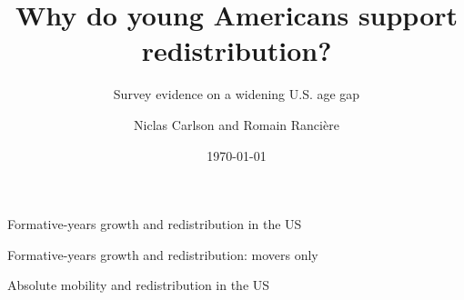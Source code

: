 \documentclass{beamer}
\title[Youth and redistribution]{Why do young Americans support redistribution?}
\subtitle{Survey evidence on a widening U.S. age gap}
\author[Carlson and Rancière]{Niclas Carlson and Romain Rancière}
\date{\today}
\begin{document}
\begin{frame}
\titlepage
\end{frame}



\begin{frame}{Formative-years growth and redistribution in the US}

\begin{table}
    \centering
    \caption{Prolific 2025: support for redistribution on home-state formative-years income growth}
    \vspace{-1.1em}
    {\tiny\setlength{\tabcolsep}{4pt}\renewcommand{\arraystretch}{0.82}
    }
\end{table}

\end{frame}



\begin{frame}{Formative-years growth and redistribution: movers only}

\begin{table}
    \centering
    \caption{Prolific 2025, movers only (home state $\neq$ current state): support for redistribution on home-state formative growth, with and without current-state FE}
    \vspace{-1.1em}
    {\tiny\setlength{\tabcolsep}{5pt}\renewcommand{\arraystretch}{0.82}
    }
\end{table}

\end{frame}



\begin{frame}{Absolute mobility and redistribution in the US}

\begin{table}
    \centering
    \caption{Prolific 2025: support for redistribution on home-state absolute mobility}
    \vspace{-1.1em}
    {\tiny\setlength{\tabcolsep}{4pt}\renewcommand{\arraystretch}{0.82}
    }
\end{table}

\end{frame}
\end{document}
